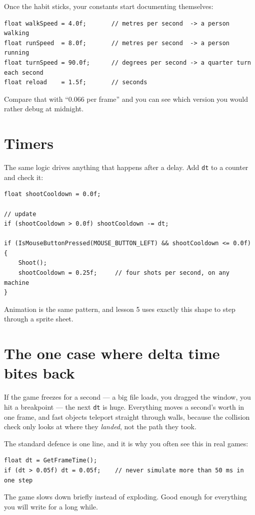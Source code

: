 Once the habit sticks, your constants start documenting themselves:

\begin{lstlisting}
float walkSpeed = 4.0f;       // metres per second  -> a person walking
float runSpeed  = 8.0f;       // metres per second  -> a person running
float turnSpeed = 90.0f;      // degrees per second -> a quarter turn each second
float reload    = 1.5f;       // seconds
\end{lstlisting}

Compare that with ``0.066 per frame'' and you can see which version you would
rather debug at midnight.

\section{Timers}

The same logic drives anything that happens after a delay. Add \lstinline|dt| to
a counter and check it:

\begin{lstlisting}
float shootCooldown = 0.0f;

// update
if (shootCooldown > 0.0f) shootCooldown -= dt;

if (IsMouseButtonPressed(MOUSE_BUTTON_LEFT) && shootCooldown <= 0.0f)
{
    Shoot();
    shootCooldown = 0.25f;     // four shots per second, on any machine
}
\end{lstlisting}

Animation is the same pattern, and lesson 5 uses exactly this shape to step
through a sprite sheet.


\section{The one case where delta time bites back}

If the game freezes for a second --- a big file loads, you dragged the window,
you hit a breakpoint --- the next \lstinline|dt| is huge. Everything moves a
second's worth in one frame, and fast objects teleport straight through walls,
because the collision check only looks at where they \emph{landed}, not the path
they took.

The standard defence is one line, and it is why you often see this in real games:

\begin{lstlisting}
float dt = GetFrameTime();
if (dt > 0.05f) dt = 0.05f;    // never simulate more than 50 ms in one step
\end{lstlisting}

The game slows down briefly instead of exploding. Good enough for everything you
will write for a long while.

